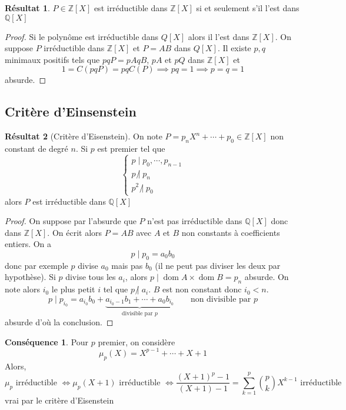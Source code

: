 \documentclass{article}
\theoremstyle{definition}
\newtheorem*{res}{Résultat}
\newtheorem{csq}{Conséquence}[subsection]
\DeclareMathOperator{\dom}{dom}
\begin{document}
\begin{res}
    $P\in\mathbb Z[X]$ est irréductible dans $\mathbb Z[X]$ si et seulement s'il l'est dans $\mathbb Q[X]$
\end{res}
\begin{proof}
Si le polynôme est irréductible dans $Q[X]$ alors il l'est dans $\mathbb Z[X]$. On suppose $P$ irréductible dans $\mathbb Z[X]$ et $P=AB$ dans $Q[X]$. Il existe $p, q$ minimaux positifs tels que $pqP=pAqB$, $pA$ et $pQ$ dans $\mathbb Z[X]$ et \[
    1=C(pqP)=pqC(P) \implies pq=1 \implies p=q=1
\]
absurde.
\end{proof}

\subsection{Critère d'Einsenstein}

\begin{res}[Critère d'Eisenstein]
On note $P=p_nX^n+\cdots + p_0\in\mathbb Z[X]$ non constant de degré $n$. Si $p$ est premier tel que \[
    \begin{cases}
    p\;|\;p_0,\cdots, p_{n-1}\\ p\;\not|\;p_n\\p^2\;\not|\;p_0
    \end{cases}
\]
alors $P$ est irréductible dans $\mathbb Q[X]$
\end{res}
\begin{proof}
On suppose par l'absurde que $P$ n'est pas irréductible dans $\mathbb Q[X]$ donc dans $\mathbb Z[X]$. On écrit alors $P=AB$ avec $A$ et $B$ non constants à coefficients entiers. On a \[
    p\;|\;p_0=a_0b_0
\]
donc par exemple $p$ divise $a_0$ mais pas $b_0$ (il ne peut pas diviser les deux par hypothèse). Si $p$ divise tous les $a_i$, alors $p\;|\;\dom A\times \dom B=p_n$ absurde. On note alors $i_0$ le plus petit $i$ tel que $p\;\not |\;a_i$. $B$ est non constant donc $i_0<n$. \[
    p\;|\; p_{i_0}=a_{i_0}b_0+\underbrace{a_{i_0-1}b_1+\cdots +a_0b_{i_0}}_{\text{divisible par }p} \qquad \text{non divisible par }p
\]
absurde d'où la conclusion.
\end{proof}

\begin{csq}
Pour $p$ premier, on considère \[
    \mu_p(X)=X^{p-1}+\cdots+X+1
\]
Alors, \[
    \mu_p\text{ irréductible }\iff \mu_p(X+1)\text{ irréductible } \iff \frac{(X+1)^p-1}{(X+1)-1}=\sum_{k=1}^p\binom pk X^{k-1}\text{ irréductible}
\]
vrai par le critère d'Eisenstein
\end{csq}
\end{document}

